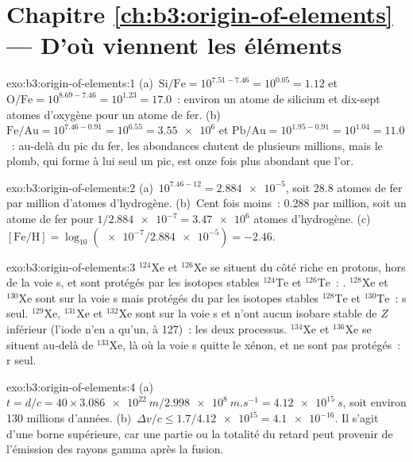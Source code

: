 \section*{Chapitre \ref{ch:b3:origin-of-elements} --- D'où viennent les éléments}

\begin{solution}{exo:b3:origin-of-elements:1}
(a)~$\mathrm{Si/Fe} = 10^{7.51 - 7.46} = 10^{0.05} = 1.12$ et
$\mathrm{O/Fe} = 10^{8.69 - 7.46} = 10^{1.23} = 17.0$~: environ un atome de silicium
et dix-sept atomes d'oxygène pour un atome de fer. (b)~$\mathrm{Fe/Au} =
10^{7.46 - 0.91} = 10^{6.55} = \num{3.55e6}$ et $\mathrm{Pb/Au} =
10^{1.95 - 0.91} = 10^{1.04} = 11.0$~: au-delà du pic du fer, les abondances
chutent de plusieurs millions, mais le plomb, qui forme à lui seul un pic,
est onze fois plus abondant que l'or.
\end{solution}

\begin{solution}{exo:b3:origin-of-elements:2}
(a)~$10^{7.46 - 12} = \num{2.884e-5}$, soit \num{28.8} atomes de fer par
million d'atomes d'hydrogène. (b)~Cent fois moins~: \num{0.288} par
million, soit un atome de fer pour $1/\num{2.884e-7} = \num{3.47e6}$ atomes
d'hydrogène. (c)~$[\mathrm{Fe/H}] = \log_{10}(\num{e-7}/\num{2.884e-5}) =
-2.46$.
\end{solution}

\begin{solution}{exo:b3:origin-of-elements:3}
$^{124}\mathrm{Xe}$ et $^{126}\mathrm{Xe}$ se situent du côté riche en protons,
hors de la voie s, et sont protégés par les isotopes stables $^{124}\mathrm{Te}$ et
$^{126}\mathrm{Te}$~: . $^{128}\mathrm{Xe}$ et $^{130}\mathrm{Xe}$
sont sur la voie s mais protégés du  par les isotopes stables
$^{128}\mathrm{Te}$ et $^{130}\mathrm{Te}$~: s seul. $^{129}\mathrm{Xe}$,
$^{131}\mathrm{Xe}$ et $^{132}\mathrm{Xe}$ sont sur la voie s et n'ont aucun isobare
stable de $Z$ inférieur (l'iode n'en a qu'un, à 127)~: les deux processus.
$^{134}\mathrm{Xe}$ et $^{136}\mathrm{Xe}$ se situent au-delà de
$^{133}\mathrm{Xe}$, là où la voie s quitte le xénon, et ne sont pas
protégés~: r seul.
\end{solution}

\begin{solution}{exo:b3:origin-of-elements:4}
(a)~$t = d/c = 40\times\qty{3.086e22}{m}/\qty{2.998e8}{m.s^{-1}} =
\qty{4.12e15}{s}$, soit environ \num{130} millions d'années. (b)~$\Delta v/c \le
1.7/\num{4.12e15} = \num{4.1e-16}$. Il s'agit d'une borne supérieure, car une
partie ou la totalité du retard peut provenir de l'émission des rayons gamma
après la fusion.
\end{solution}

